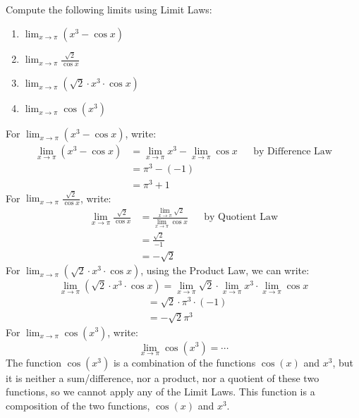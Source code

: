 \documentclass{ximera}
\begin{document}
\begin{example}
  Compute the following limits using Limit Laws:
  \begin{enumerate}
  \item\label{lle1a} $\lim_{x\to \pi} (x^3-\cos{x})$
  \item\label{lle1b} $\lim_{x\to \pi} \frac{\sqrt{2}}{\cos{x}}$
  \item\label{lle1c} $\lim_{x\to \pi} (\sqrt{2}\cdot x^3\cdot\cos{x})$
  \item\label{lle1d} $\lim_{x\to \pi} \cos({x^3})$
  \end{enumerate}
  \begin{explanation}
    For $\lim_{x\to \pi} (x^3-\cos{x})$, write:
    \begin{align*}
      \lim_{x\to \pi} (x^3-\cos{x})&=\lim_{x\to \pi} x^3-\lim_{x\to \pi}\cos{x} && \text{by Difference Law}\\
      &=\pi^3-(-1)\\
      &=\pi^3+1
    \end{align*}
    For $\lim_{x\to \pi} \frac{\sqrt{2}}{\cos{x}}$, write:
    \begin{align*}
      \lim_{x\to \pi} \frac{\sqrt{2}}{\cos{x}}&=\frac{\lim_{x\to \pi}\sqrt{2}}{\lim_{x\to \pi}\cos{x}} && \text{by Quotient Law}\\
      &=\frac{\sqrt{2}}{-1}\\
      &=-\sqrt{2}
    \end{align*}
    For $\lim_{x\to \pi} (\sqrt{2}\cdot x^3\cdot\cos{x})$, using the Product Law, we can write:
    \[
    \lim_{x\to \pi} (\sqrt{2}\cdot x^3\cdot\cos{x})=\lim_{x\to \pi} \sqrt{2}\cdot \lim_{x\to \pi}x^3\cdot \lim_{x\to \pi}\cos{x}
    \]
    \begin{align*}
      &=\sqrt{2}\cdot \pi^3\cdot(-1)\\
      &=-\sqrt{2}\pi^3
    \end{align*}
    For $\lim_{x\to \pi} \cos({x^3})$, write:
    \[
    \lim_{x\to \pi} \cos({x^3})= \cdots 
    \]
    The function $\cos({x^3})$ is a combination of the functions
    $\cos({x})$ and $x^3$, but it is neither a sum/difference, nor a
    product, nor a quotient of these two functions, so we cannot apply
    any of the Limit Laws. This function is a composition of the two
    functions, $\cos({x})$ and $x^3$.
  \end{explanation}
\end{example}
\end{document}
